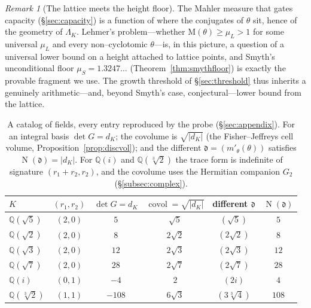 \documentclass[11pt]{article}
\theoremstyle{plain}
\theoremstyle{definition}
\theoremstyle{remark}
\newtheorem{remark}[theorem]{Remark}
\newcommand{\Q}{\mathbb{Q}}
\newcommand{\K}{K}
\newcommand{\Nm}{\operatorname{N}}
\newcommand{\Mah}{\mathrm{M}}
\newcommand{\GG}{G}
\begin{document}
\begin{remark}[The lattice meets the height floor]\label{rem:lehmerlattice}
The Mahler measure that gates capacity (\S\ref{sec:capacity}) is a function of where the conjugates of
$\theta$ sit, hence of the geometry of $\Lambda_\K$. Lehmer's problem---whether $\Mah(\theta)\ge\mu_L>1$ for
some universal $\mu_L$ and every non--cyclotomic $\theta$---is, in this picture, a question of a universal
lower bound on a height attached to lattice points, and Smyth's unconditional floor $\mu_S=1.3247\ldots$
(Theorem~\ref{thm:smythfloor}) is exactly the provable fragment we use. The growth threshold of
\S\ref{sec:threshold} thus inherits a genuinely arithmetic---and, beyond Smyth's case, conjectural---lower
bound from the lattice.
\end{remark}

\begin{table}[ht]
\centering
\small
\begin{tabular}{lccccc}
\toprule
$\K$ & $(r_1,r_2)$ & $\det\GG=d_\K$ & $\operatorname{covol}=\sqrt{|d_\K|}$ & different $\mathfrak d$ & $\Nm(\mathfrak d)$ \\
\midrule
$\Q(\sqrt5)$    & $(2,0)$ & $5$    & $\sqrt5$  & $(\sqrt5)$     & $5$   \\
$\Q(\sqrt2)$    & $(2,0)$ & $8$    & $2\sqrt2$ & $(2\sqrt2)$    & $8$   \\
$\Q(\sqrt3)$    & $(2,0)$ & $12$   & $2\sqrt3$ & $(2\sqrt3)$    & $12$  \\
$\Q(\sqrt7)$    & $(2,0)$ & $28$   & $2\sqrt7$ & $(2\sqrt7)$    & $28$  \\
$\Q(i)$         & $(0,1)$ & $-4$   & $2$       & $(2i)$         & $4$   \\
$\Q(\sqrt[3]2)$ & $(1,1)$ & $-108$ & $6\sqrt3$ & $(3\sqrt[3]4)$ & $108$ \\
\bottomrule
\end{tabular}
\caption{A catalog of fields, every entry reproduced by the probe (\S\ref{sec:appendix}). For an integral
basis $\det\GG=d_\K$; the covolume is $\sqrt{|d_\K|}$ (the Fisher--Jeffreys cell volume,
Proposition~\ref{prop:discvol}); and the different $\mathfrak d=(m'_\theta(\theta))$ satisfies
$\Nm(\mathfrak d)=|d_\K|$. For $\Q(i)$ and $\Q(\sqrt[3]2)$ the trace form is indefinite of signature
$(r_1+r_2,r_2)$, and the covolume uses the Hermitian companion $G_2$ (\S\ref{subsec:complex}).}
\label{tab:catalog}
\end{table}
\end{document}
